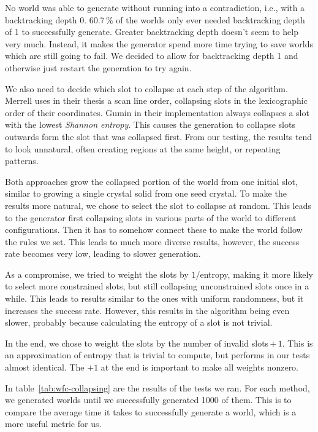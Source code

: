 No world was able to generate without running into a contradiction, i.e., with a backtracking depth 0.
60.7\,\% of the worlds only ever needed backtracking depth of 1 to successfully generate.
Greater backtracking depth doesn't seem to help very much.
Instead, it makes the generator spend more time trying to save worlds which are still going to fail.
We decided to allow for backtracking depth 1 and otherwise just restart the generation to try again.

We also need to decide which slot to collapse at each step of the algorithm.
Merrell uses in their thesis a scan line order, collapsing slots in the lexicographic order of their coordinates.
Gumin in their implementation always collapses a slot with the lowest \emph{Shannon entropy}.
This causes the generation to collapse slots outwards form the slot that was collapsed first.
From our testing, the results tend to look unnatural, often creating regions at the same height, or repeating patterns.

Both approaches grow the collapsed portion of the world from one initial slot, similar to growing a single crystal solid from one seed crystal.
To make the results more natural, we chose to select the slot to collapse at random.
This leads to the generator first collapsing slots in various parts of the world to different configurations.
Then it has to somehow connect these to make the world follow the rules we set.
This leads to much more diverse results, however, the success rate becomes very low, leading to slower generation.

As a compromise, we tried to weight the slots by $1/$entropy, making it more likely to select more constrained slots, but still collapsing unconstrained slots once in a while.
This leads to results similar to the ones with uniform randomness, but it increases the success rate.
However, this results in the algorithm being even slower, probably because calculating the entropy of a slot is not trivial.

In the end, we chose to weight the slots by the number of invalid slots\,$+\,1$.
This is an approximation of entropy that is trivial to compute, but performs in our tests almost identical.
The $+1$ at the end is important to make all weights nonzero.

In table~\ref{tab:wfc-collapsing} are the results of the tests we ran.
For each method, we generated worlds until we successfully generated 1000 of them.
This is to compare the average time it takes to successfully generate a world, which is a more useful metric for us.

